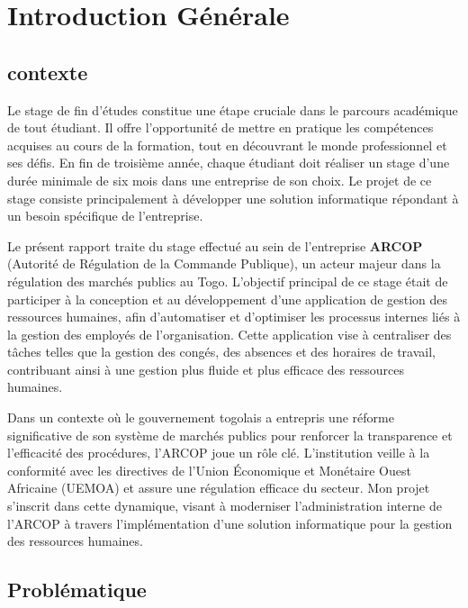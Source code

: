 \chapter{Introduction Générale}
\clearpage
\section{contexte}

Le stage de fin d’études constitue une étape cruciale dans le parcours académique de tout étudiant. Il offre l’opportunité de mettre en pratique les compétences acquises au cours de la formation, tout en découvrant le monde professionnel et ses défis. En fin de troisième année, chaque étudiant doit réaliser un stage d’une durée minimale de six mois dans une entreprise de son choix. Le projet de ce stage consiste principalement à développer une solution informatique répondant à un besoin spécifique de l'entreprise.

Le présent rapport traite du stage effectué au sein de l’entreprise \textbf{ARCOP} (Autorité de Régulation de la Commande Publique), un acteur majeur dans la régulation des marchés publics au Togo. L'objectif principal de ce stage était de participer à la conception et au développement d'une application de gestion des ressources humaines, afin d'automatiser et d'optimiser les processus internes liés à la gestion des employés de l'organisation. Cette application vise à centraliser des tâches telles que la gestion des congés, des absences et des horaires de travail, contribuant ainsi à une gestion plus fluide et plus efficace des ressources humaines.

Dans un contexte où le gouvernement togolais a entrepris une réforme significative de son système de marchés publics pour renforcer la transparence et l'efficacité des procédures, l'ARCOP joue un rôle clé. L'institution veille à la conformité avec les directives de l’Union Économique et Monétaire Ouest Africaine (UEMOA) et assure une régulation efficace du secteur. Mon projet s’inscrit dans cette dynamique, visant à moderniser l’administration interne de l'ARCOP à travers l'implémentation d'une solution informatique pour la gestion des ressources humaines.
\section{Problématique}
